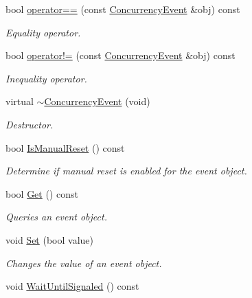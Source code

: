 \begin{DoxyCompactItemize}
bool \hyperlink{class_concurrency_event_a7732f4316daa70d13e8a633b53157078}{operator==} (const \hyperlink{class_concurrency_event}{ConcurrencyEvent} \&obj) const 
\begin{DoxyCompactList}\small\item\em Equality operator. \item\end{DoxyCompactList}\item 
bool \hyperlink{class_concurrency_event_a07e7c9f76a4cc5b19922a4a2543905fc}{operator!=} (const \hyperlink{class_concurrency_event}{ConcurrencyEvent} \&obj) const 
\begin{DoxyCompactList}\small\item\em Inequality operator. \item\end{DoxyCompactList}\item 
\hypertarget{class_concurrency_event_a5be5c32806214a1fe2d4f5665e88e54e}{
virtual \hyperlink{class_concurrency_event_a5be5c32806214a1fe2d4f5665e88e54e}{$\sim$ConcurrencyEvent} (void)}
\label{class_concurrency_event_a5be5c32806214a1fe2d4f5665e88e54e}

\begin{DoxyCompactList}\small\item\em Destructor. \item\end{DoxyCompactList}\item 
bool \hyperlink{class_concurrency_event_a4773bf3431af555e964d21635d3e5e38}{IsManualReset} () const 
\begin{DoxyCompactList}\small\item\em Determine if manual reset is enabled for the event object. \item\end{DoxyCompactList}\item 
bool \hyperlink{class_concurrency_event_aadb3a5e0b14aff16cc6a2a953d66537f}{Get} () const 
\begin{DoxyCompactList}\small\item\em Queries an event object. \item\end{DoxyCompactList}\item 
void \hyperlink{class_concurrency_event_ac1720b04023269e3fb78750ee1ca21e3}{Set} (bool value)
\begin{DoxyCompactList}\small\item\em Changes the value of an event object. \item\end{DoxyCompactList}\item 
\hypertarget{class_concurrency_event_a00bce9f08579da7166a16477fdba31a8}{
void \hyperlink{class_concurrency_event_a00bce9f08579da7166a16477fdba31a8}{WaitUntilSignaled} () const }
\label{class_concurrency_event_a00bce9f08579da7166a16477fdba31a8}


\end{DoxyCompactItemize}
